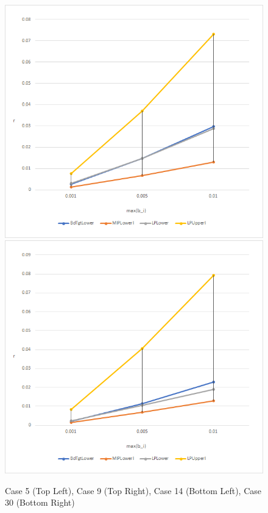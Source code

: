 \documentclass[11pt]{article}
\theoremstyle{plain}
\theoremstyle{definition}
\theoremstyle{remark}
\begin{document}
\begin{figure}[h]
\begin{center}
\includegraphics[scale=0.4]{Figures/Case14}
\includegraphics[scale=0.4]{Figures/Case30}
\caption{Case 5 (Top Left), Case 9 (Top Right), Case 14 (Bottom Left), Case 30 (Bottom Right)}
\end{center}
\end{figure} 

\newpage
\end{document}
